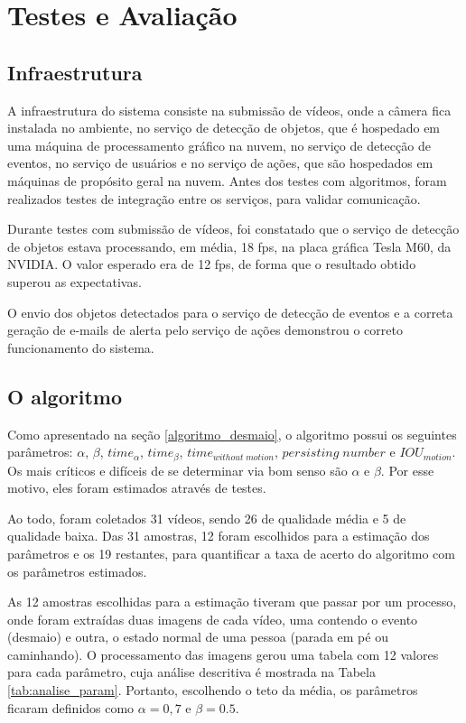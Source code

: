 \documentclass[]{politex}
\begin{document}
\chapter{Testes e Avaliação}
\section{Infraestrutura}
A infraestrutura do sistema consiste na submissão de vídeos, onde a câmera fica instalada no ambiente, no serviço de detecção de objetos, que é hospedado em uma máquina de processamento gráfico na nuvem, no serviço de detecção de eventos, no serviço de usuários e no serviço de ações, que são hospedados em máquinas de propósito geral na nuvem. Antes dos testes com algoritmos, foram realizados testes de integração entre os serviços, para validar comunicação.

Durante testes com submissão de vídeos, foi constatado que o serviço de detecção de objetos estava processando, em média, 18 \acrshort{fps}, na placa gráfica Tesla M60, da NVIDIA. O valor esperado era de 12 \acrshort{fps}, de forma que o resultado obtido superou as expectativas.

O envio dos objetos detectados para o serviço de detecção de eventos e a correta geração de e-mails de alerta pelo serviço de ações demonstrou o correto funcionamento do sistema.

\section{O algoritmo}\label{o_algoritmo}
Como apresentado na seção \ref{algoritmo_desmaio}, o algoritmo possui os seguintes parâmetros: \(\alpha\), \(\beta\), \(time_\alpha\), \(time_\beta\), \(time_{without\;motion}\), \(persisting\;number\) e \(IOU_{motion}\). Os mais críticos e difíceis de se determinar via bom senso são \(\alpha\) e \(\beta\). Por esse motivo, eles foram estimados através de testes.

Ao todo, foram coletados 31 vídeos, sendo 26 de qualidade média e 5 de qualidade baixa. Das 31 amostras, 12 foram escolhidos para a estimação dos parâmetros e os 19 restantes, para quantificar a taxa de acerto do algoritmo com os parâmetros estimados. 

As 12 amostras escolhidas para a estimação tiveram que passar por um processo, onde foram extraídas duas imagens de cada vídeo, uma contendo o evento (desmaio) e outra, o estado normal de uma pessoa (parada em pé ou caminhando). O processamento das imagens gerou uma tabela com 12 valores para cada parâmetro, cuja análise descritiva é mostrada na Tabela \ref{tab:analise_param}. Portanto, escolhendo o teto da média, os parâmetros ficaram definidos como \(\alpha=0,7\) e \(\beta=0.5\).
\end{document}
